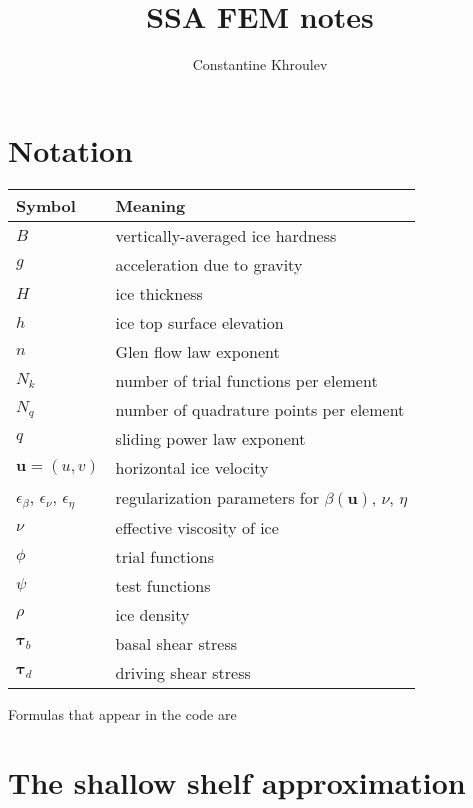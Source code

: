 \documentclass{amsart}
\newcommand{\betaU}{\beta(\boldsymbol{u})}
\newcommand{\basalshearstress}[1]{\boldsymbol{\tau}_{b#1}}
\newcommand{\taub}{\basalshearstress{}}
\newcommand{\drivingstress}[1]{\boldsymbol{\tau}_{d#1}}
\newcommand{\taud}{\drivingstress{}}
\newcommand{\highlight}[1]{{\color{red!80!black} \fbox{$ \displaystyle #1 $} }}
\begin{document}
\title{SSA FEM notes}
\author{Constantine Khroulev}
\maketitle
\tableofcontents


\section{Notation}
\label{sec-1}

\begin{center}
\begin{tabular}{ll}
Symbol & Meaning\\
\hline
$B$ & vertically-averaged ice hardness\\
$g$ & acceleration due to gravity\\
$H$ & ice thickness\\
$h$ & ice top surface elevation\\
$n$ & Glen flow law exponent\\
$N_k$ & number of trial functions per element\\
$N_q$ & number of quadrature points per element\\
$q$ & sliding power law exponent\\
$\boldsymbol{u} = (u,v)$ & horizontal ice velocity\\
$\epsilon_{\beta}$, $\epsilon_{\nu}$, $\epsilon_{\eta}$ & regularization parameters for $\betaU$, $\nu$, $\eta$\\
$\nu$ & effective viscosity of ice\\
$\phi$ & trial functions\\
$\psi$ & test functions\\
$\rho$ & ice density\\
$\taub$ & basal shear stress\\
$\taud$ & driving shear stress\\
\end{tabular}
\end{center}

Formulas that appear in the code are \highlight{highlighted.}

\section{The shallow shelf approximation}
\label{sec:ssa-strong}
\end{document}

